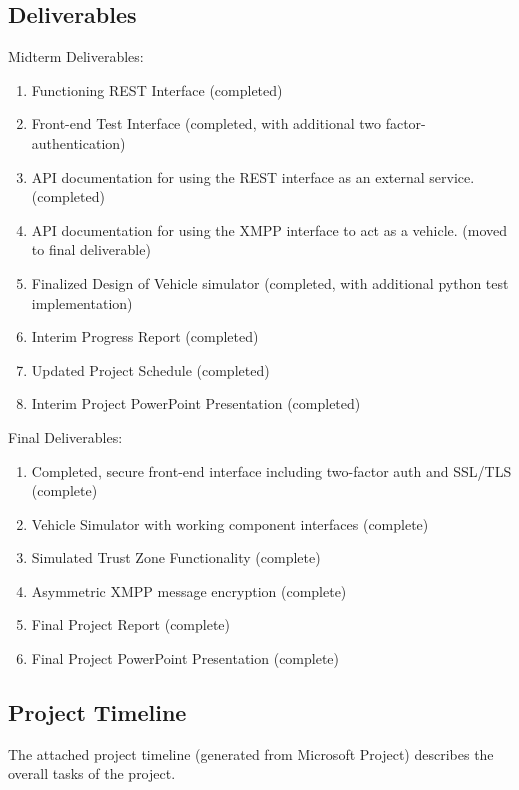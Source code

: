 \documentclass[conference,12pt]{IEEEtran}
\begin{document}
\subsection{Deliverables}

Midterm Deliverables:
\begin{enumerate}
\item Functioning REST Interface (completed)
\item Front-end Test Interface (completed, with additional two factor-authentication)
\item API documentation for using the REST interface as an external service. (completed)
\item API documentation for using the XMPP interface to act as a vehicle. (moved to final deliverable)
\item Finalized Design of Vehicle simulator (completed, with additional python test implementation)
\item Interim Progress Report (completed)
\item Updated Project Schedule (completed)
\item Interim Project PowerPoint Presentation (completed)
\end{enumerate}

Final Deliverables:
\begin{enumerate}
\item Completed, secure front-end interface including two-factor auth and
    SSL/TLS (complete)
\item Vehicle Simulator with working component interfaces (complete)
\item Simulated Trust Zone Functionality (complete)
\item Asymmetric XMPP message encryption (complete)
\item Final Project Report (complete)
\item Final Project PowerPoint Presentation (complete)
\end{enumerate}

\subsection{Project Timeline}
The attached project timeline (generated from Microsoft Project) describes the
overall tasks of the project.
\end{document}
